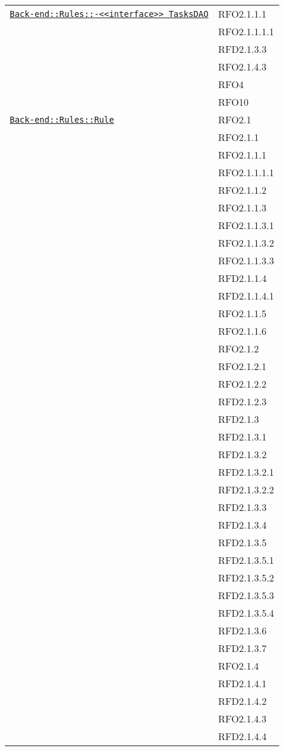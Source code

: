 \begin{longtable}{|>{\centering}m{10cm}|m{3cm}<{\centering}|}
\hyperref[Back-end::Rules::<<interface>> TasksDAO]{\texttt{Back-end::Rules::-\linebreak <<interface>> TasksDAO}} & RFO2.1.1.1\\
& RFO2.1.1.1.1\\
& RFD2.1.3.3\\
& RFO2.1.4.3\\
& RFO4\\
& RFO10\\ \hline

\hyperref[Back-end::Rules::Rule]{\texttt{Back-end::Rules::Rule}} & RFO2.1\\
& RFO2.1.1\\
& RFO2.1.1.1\\
& RFO2.1.1.1.1\\
& RFO2.1.1.2\\
& RFO2.1.1.3\\
& RFO2.1.1.3.1\\
& RFO2.1.1.3.2\\
& RFO2.1.1.3.3\\
& RFD2.1.1.4\\
& RFD2.1.1.4.1\\
& RFO2.1.1.5\\
& RFO2.1.1.6\\
& RFO2.1.2\\
& RFO2.1.2.1\\
& RFO2.1.2.2\\
& RFD2.1.2.3\\
& RFD2.1.3\\
& RFD2.1.3.1\\
& RFD2.1.3.2\\
& RFD2.1.3.2.1\\
& RFD2.1.3.2.2\\
& RFD2.1.3.3\\
& RFD2.1.3.4\\
& RFD2.1.3.5\\
& RFD2.1.3.5.1\\
& RFD2.1.3.5.2\\
& RFD2.1.3.5.3\\
& RFD2.1.3.5.4\\
& RFD2.1.3.6\\
& RFD2.1.3.7\\
& RFO2.1.4\\
& RFD2.1.4.1\\
& RFD2.1.4.2\\
& RFO2.1.4.3\\
& RFD2.1.4.4\\ \hline


\end{longtable}

